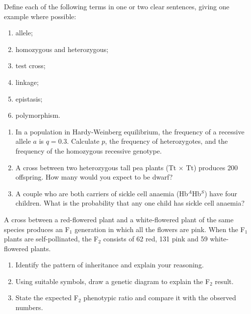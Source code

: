 \documentclass[11pt]{article}
\newcounter{popsec}
\newcounter{popsub}
\newcommand{\courssub}[1]{%
  \stepcounter{popsub}%
  \par\vspace{9pt}\noindent{\popxbold\fontsize{11.5}{13}\selectfont\color{popink}{\color{poporange}\thepopsec.\thepopsub}\hspace{6pt}#1}\par\nopagebreak\vspace{4pt}
}
\begin{document}
\begin{exercice}
Define each of the following terms in one or two clear sentences, giving one example where possible:
\begin{enumerate}
\item allele;
\item homozygous and heterozygous;
\item test cross;
\item linkage;
\item epistasis;
\item polymorphism.
\end{enumerate}
\end{exercice}

\begin{exercice}
\begin{enumerate}
\item In a population in Hardy-Weinberg equilibrium, the frequency of a recessive allele $a$ is $q = 0.3$. Calculate $p$, the frequency of heterozygotes, and the frequency of the homozygous recessive genotype.
\item A cross between two heterozygous tall pea plants (Tt $\times$ Tt) produces 200 offspring. How many would you expect to be dwarf?
\item A couple who are both carriers of sickle cell anaemia (Hb$^A$Hb$^S$) have four children. What is the probability that any one child has sickle cell anaemia?
\end{enumerate}
\end{exercice}

\courssub{I practise}

\begin{exercice}
A cross between a red-flowered plant and a white-flowered plant of the same species produces an F$_1$ generation in which all the flowers are pink. When the F$_1$ plants are self-pollinated, the F$_2$ consists of 62 red, 131 pink and 59 white-flowered plants.
\begin{enumerate}
\item Identify the pattern of inheritance and explain your reasoning.
\item Using suitable symbols, draw a genetic diagram to explain the F$_2$ result.
\item State the expected F$_2$ phenotypic ratio and compare it with the observed numbers.
\end{enumerate}
\end{exercice}
\end{document}
